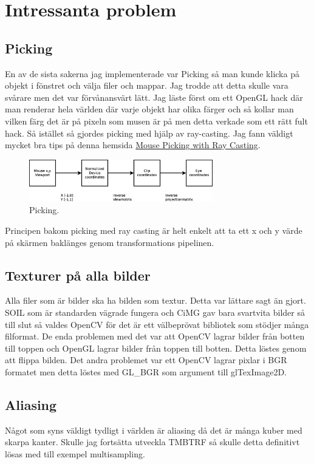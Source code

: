 \section{Intressanta problem}
\subsection{Picking}
En av de sista sakerna jag implementerade var Picking så man kunde klicka på objekt i fönstret och välja filer och mappar. Jag trodde att detta skulle vara svårare men det var förvånansvärt lätt. Jag läste först om ett OpenGL hack där man renderar hela världen där varje objekt har olika färger och så kollar man vilken färg det är på pixeln som musen är på men detta verkade som ett rätt fult hack. Så istället så gjordes picking med hjälp av ray-casting. Jag fann väldigt mycket bra tips på denna hemsida \href{http://antongerdelan.net/opengl/raycasting.html}{Mouse Picking with Ray Casting}. 
\begin{center}
\begin{figure}[H]
    \centering
\includegraphics[width=8cm]{../grafik/picking.eps}
\caption{Picking.}
\label{fig:picking}
\end{figure}
\end{center}
Principen bakom picking med ray casting är helt enkelt att ta ett x och y värde på skärmen baklänges genom transformations pipelinen. 

\subsection{Texturer på alla bilder}
Alla filer som är bilder ska ha bilden som textur. Detta var lättare sagt än gjort. SOIL som är standarden vägrade fungera och CiMG gav bara svartvita bilder så till slut så valdes OpenCV för det är ett välbeprövat bibliotek som stödjer många filformat. De enda problemen med det var att OpenCV lagrar bilder från botten till toppen och OpenGL lagrar bilder från toppen till botten. Detta löstes genom att flippa bilden. Det andra problemet var ett OpenCV lagrar pixlar i BGR formatet men detta löstes med GL\_BGR som argument till glTexImage2D.

\subsection{Aliasing}
Något som syns väldigt tydligt i världen är aliasing då det är många kuber med skarpa kanter. Skulle jag fortsätta utveckla TMBTRF så skulle detta definitivt lösas med till exempel multisampling. 

